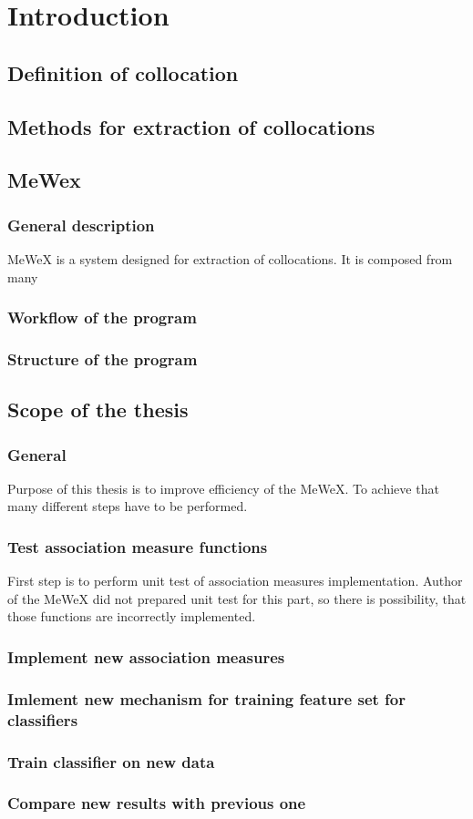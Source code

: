 
\chapter{Introduction}

\section{Definition of collocation}

\section{Methods for extraction of collocations}

\section{MeWex}

\subsection{General description}
MeWeX is a system designed for extraction of collocations. It is composed from many

\subsection{Workflow of the program}

\subsection{Structure of the program}

\section{Scope of the thesis}

\subsection{General}
Purpose of this thesis is to improve efficiency of the MeWeX. To achieve that many different steps have to be performed.

\subsection{Test association measure functions}
First step is to perform unit test of association measures implementation. Author of the MeWeX did not prepared unit test for this part, so there is possibility, that those functions are incorrectly implemented.
\subsection{Implement new association measures}

\subsection{Imlement new mechanism for training feature set for classifiers}

\subsection{Train classifier on new data}

\subsection{Compare new results with previous one}
